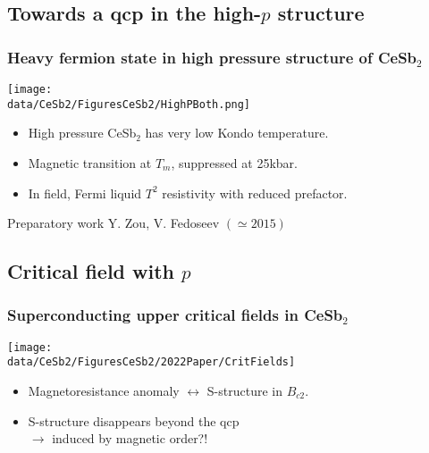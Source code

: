 \subsection{Towards a qcp in the high-$p$ structure}
\begin{frame}[label=CeSb2HighestP]
\frametitle{Heavy fermion state in high pressure structure of CeSb$_2$}


\centerline{\texttt{[image: \\data/CeSb2/FiguresCeSb2/HighPBoth.png]}}

\begin{itemize}
\item
High pressure CeSb$_2$ has very low Kondo temperature.

\item
Magnetic transition at $T_m$, suppressed at 25kbar.

\item
In field, Fermi liquid $T^2$ resistivity with reduced prefactor.

\end{itemize}
\vspace{0em}
\centerline{\makebox[\linewidth]{\rule{0.85\textwidth}{0.4pt}}}

\centerline{\scriptsize Preparatory work Y. Zou, V. Fedoseev $(\simeq 2015)$}

\end{frame}


\subsection{Critical field with $p$}
\begin{frame}[label=CriticalFields]
\frametitle{Superconducting upper critical fields in CeSb$_2$}

\centerline{\texttt{[image: \\data/CeSb2/FiguresCeSb2/2022Paper/CritFields]}}

%
\begin{itemize}
\item Magnetoresistance anomaly $\leftrightarrow$ S-structure in $B_{c2}$.
\item S-structure disappears beyond the qcp \\ \raggedleft $\rightarrow$ induced by magnetic order?! %

\end{itemize}

\end{frame}




